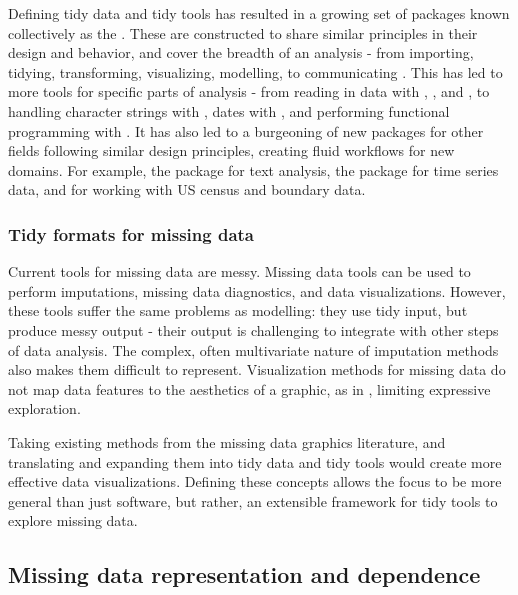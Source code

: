 \documentclass[
]{jss}
\begin{document}
Defining tidy data and tidy tools has resulted in a growing set of packages known collectively as the  \citep{tidyverse}. These are constructed to share similar principles in their design and behavior, and cover the breadth of an analysis - from importing, tidying, transforming, visualizing, modelling, to communicating \citep{r4ds, tidyverse}. This has led to more tools for specific parts of analysis - from reading in data with , , and , to handling character strings with , dates with , and performing functional programming with  \citep{readr, readxl, haven, stringr, lubridate, purrr}. It has also led to a burgeoning of new packages for other fields following similar design principles, creating fluid workflows for new domains. For example, the  \citep{tidytext} package for text analysis, the  \citep{wang2020tsibble} package for time series data, and  \citep{tidycensus} for working with US census and boundary data.

\hypertarget{tidy-formats-missing-data}{%
\subsubsection{Tidy formats for missing data}\label{tidy-formats-missing-data}}

Current tools for missing data are messy. Missing data tools can be used to perform imputations, missing data diagnostics, and data visualizations. However, these tools suffer the same problems as modelling: they use tidy input, but produce messy output - their output is challenging to integrate with other steps of data analysis. The complex, often multivariate nature of imputation methods also makes them difficult to represent. Visualization methods for missing data do not map data features to the aesthetics of a graphic, as in , limiting expressive exploration.

Taking existing methods from the missing data graphics literature, and translating and expanding them into tidy data and tidy tools would create more effective data visualizations. Defining these concepts allows the focus to be more general than just software, but rather, an extensible framework for tidy tools to explore missing data.

\hypertarget{missing-data-rep-dep}{%
\subsection{Missing data representation and dependence}\label{missing-data-rep-dep}}
\end{document}
